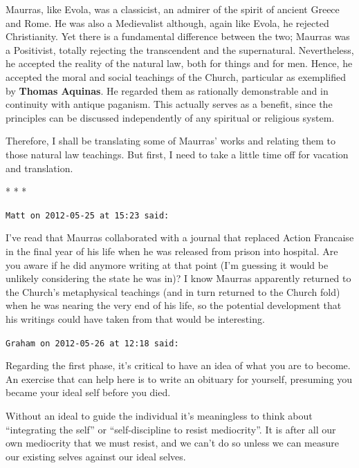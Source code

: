 Maurras, like Evola, was a classicist, an admirer of the spirit of ancient Greece and Rome. He was also a Medievalist although, again like Evola, he rejected Christianity. Yet there is a fundamental difference between the two; Maurras was a Positivist, totally rejecting the transcendent and the supernatural. Nevertheless, he accepted the reality of the natural law, both for things and for men. Hence, he accepted the moral and social teachings of the Church, particular as exemplified by \textbf{Thomas Aquinas}. He regarded them as rationally demonstrable and in continuity with antique paganism. This actually serves as a benefit, since the principles can be discussed independently of any spiritual or religious system.

Therefore, I shall be translating some of Maurras' works and relating them to those natural law teachings. But first, I need to take a little time off for vacation and translation.


\begin{center}* * *\end{center}

\begin{footnotesize}
\begin{sffamily}
\texttt{Matt on 2012-05-25 at 15:23 said:}

I've read that Maurras collaborated with a journal that replaced Action Francaise in the final year of his life when he was released from prison into hospital. Are you aware if he did anymore writing at that point (I'm guessing it would be unlikely considering the state he was in)? I know Maurras apparently returned to the Church's metaphysical teachings (and in turn returned to the Church fold) when he was nearing the very end of his life, so the potential development that his writings could have taken from that would be interesting.

\hfill

\texttt{Graham on 2012-05-26 at 12:18 said:}

Regarding the first phase, it's critical to have an idea of what you are to become. An exercise that can help here is to write an obituary for yourself, presuming you became your ideal self before you died.

Without an ideal to guide the individual it's meaningless to think about ``integrating the self'' or ``self-discipline to resist mediocrity''. It is after all our own mediocrity that we must resist, and we can't do so unless we can measure our existing selves against our ideal selves.

\hfill

\end{sffamily}
\end{footnotesize}

